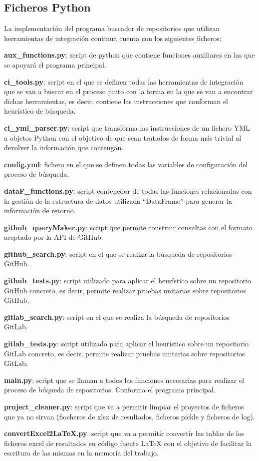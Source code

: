 \subsection{Ficheros Python}
La implementación del programa buscador de repositorios que utilizan herramientas de integración continua cuenta con los siguientes ficheros:
\begin{compactitem}
    \item \textbf{aux\_functions.py}: script de python que contiene funciones auxiliares en las que se apoyará el programa principal.
    \item \textbf{ci\_tools.py}: script en el que se definen todas las herramientas de integración que se van a buscar en el proceso junto con la forma en la que se van a encontrar dichas herramientas, es decir, contiene las instrucciones que conforman el heurístico de búsqueda.
    \item \textbf{ci\_yml\_parser.py}: script que transforma las instrucciones de un fichero YML a objetos Python con el objetivo de que sean tratados  de forma más trivial al devolver la información que contengan.
    \item \textbf{config.yml}: fichero en el que se definen todas las variables de configuración del proceso de búsqueda.
    \item \textbf{dataF\_functions.py}: script contenedor de todas las funciones relacionadas con la gestión de la estructura de datos utilizada ``DataFrame'' para generar la información de retorno.
    \item \textbf{github\_queryMaker.py}: script que permite construir consultas con el formato aceptado por la API de GitHub.
    \item \textbf{github\_search.py}: script en el que se realiza la búsqueda de repositorios GitHub.
    \item \textbf{github\_tests.py}: script utilizado para aplicar el heurístico sobre un repositorio GitHub concreto, es decir, permite realizar pruebas unitarias sobre repositorios GitHub.
    \item \textbf{gitlab\_search.py}: script en el que se realiza la búsqueda de repositorios GitLab.
    \item \textbf{gitlab\_tests.py}: script utilizado para aplicar el heurístico sobre un repositorio GitLab concreto, es decir, permite realizar pruebas unitarias sobre repositorios GitLab.
    \item \textbf{main.py}: script que se llaman a todos las funciones necesarias para realizar el proceso de búqueda de repositorios. Conforma el programa principal.
    \item \textbf{project\_cleaner.py}: script que va a permitir limpiar el proyectos de ficheros que ya no sirvan (fiocheros de xlsx de resultados, ficheros pickle y ficheros de log).
    \item \textbf{convertExcel2LaTeX.py}: script que va a permitir convertir las tablas de los ficheros excel de resultados en código fuente LaTeX con el objetivo de facilitar la escritura de las mismas en la memoria del trabajo.
\end{compactitem}

